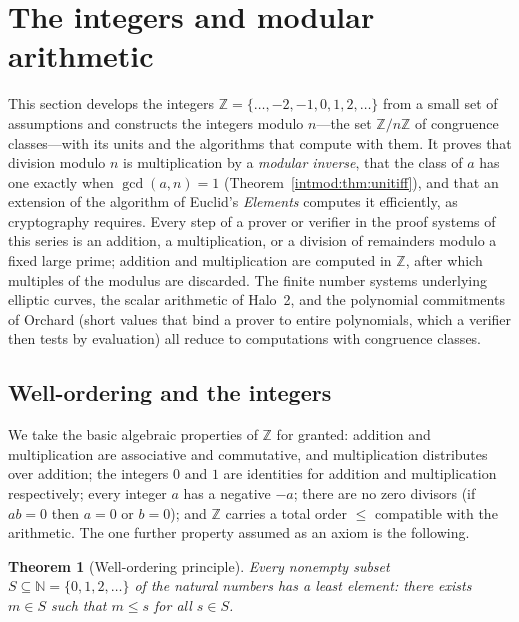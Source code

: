\documentclass[11pt,a4paper]{article}
\newtheorem{theorem}{Theorem}[section]
\theoremstyle{definition}
\theoremstyle{remark}
\newcommand{\N}{\ensuremath{\mathbb{N}}}
\newcommand{\Z}{\ensuremath{\mathbb{Z}}}
\begin{document}
\FloatBarrier
\section{The integers and modular arithmetic}\label{sec:intmod}

This section develops the integers \(\Z=\{\dots,-2,-1,0,1,2,\dots\}\) from a
small set of assumptions and constructs the integers modulo \(n\)---the set
\(\Z/n\Z\) of congruence classes---with its units and the algorithms that
compute with them. It proves that division modulo \(n\) is multiplication by a
\emph{modular inverse}, that the class of \(a\) has one exactly when
\(\gcd(a,n)=1\) (Theorem~\ref{intmod:thm:unitiff}), and that an extension of
the algorithm of Euclid's \emph{Elements} computes it efficiently, as
cryptography requires. Every step of a prover or verifier in the proof systems
of this series is an addition, a multiplication, or a division of remainders
modulo a fixed large prime; addition and multiplication are computed in
\(\Z\), after which multiples of the modulus are discarded. The finite number
systems underlying elliptic curves, the scalar arithmetic of Halo~2, and the
polynomial commitments of Orchard (short values that bind a prover to entire
polynomials, which a verifier then tests by evaluation) all reduce to
computations with congruence classes.

\subsection{Well-ordering and the integers}\label{intmod:sub:wellordering}

We take the basic algebraic properties of \(\Z\) for granted: addition and
multiplication are associative and commutative, and multiplication distributes
over addition; the integers \(0\) and \(1\) are identities for addition and
multiplication respectively; every integer \(a\) has a negative \(-a\); there
are no zero divisors (if \(ab=0\) then \(a=0\) or \(b=0\)); and \(\Z\) carries
a total order \(\le\) compatible with the arithmetic. The one further property
assumed as an axiom is the following.

\begin{theorem}[Well-ordering principle]\label{intmod:thm:wop}
Every nonempty subset \(S\subseteq\N=\{0,1,2,\dots\}\) of the natural numbers
has a least element: there exists \(m\in S\) such that \(m\le s\) for all
\(s\in S\).
\end{theorem}
\end{document}
